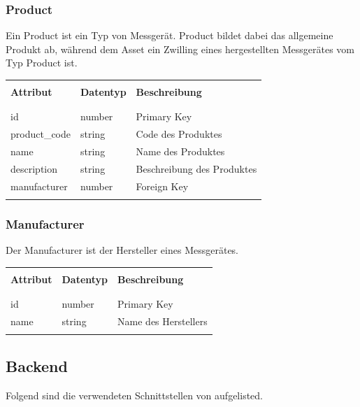 \subsubsection{Product}
Ein Product ist ein Typ von Messgerät. Product bildet dabei das allgemeine Produkt ab, während dem Asset ein Zwilling eines hergestellten Messgerätes vom Typ Product ist.
\begin{table}[H]
  \begin{tabularx}{\textwidth}{l l X}\hline \\
  \textbf{Attribut} & \textbf{Datentyp} & \textbf{Beschreibung}  \\ \\\hline \\
  id & number & Primary Key \\
  product\_code & string & Code des Produktes \\
  name & string & Name des Produktes \\
  description & string & Beschreibung des Produktes \\
  manufacturer & number & Foreign Key \\
  \\\hline
  \end{tabularx}
\end{table}
\subsubsection{Manufacturer}
Der Manufacturer ist der Hersteller eines Messgerätes.
\begin{table}[H]
  \begin{tabularx}{\textwidth}{l l X}\hline \\
  \textbf{Attribut} & \textbf{Datentyp} & \textbf{Beschreibung}  \\ \\\hline \\
  id & number & Primary Key \\
  name& string & Name des Herstellers \\
  \\\hline
  \end{tabularx}
\end{table}
\pagebreak
\subsection{Backend}
Folgend sind die verwendeten Schnittstellen von  aufgelisted.
